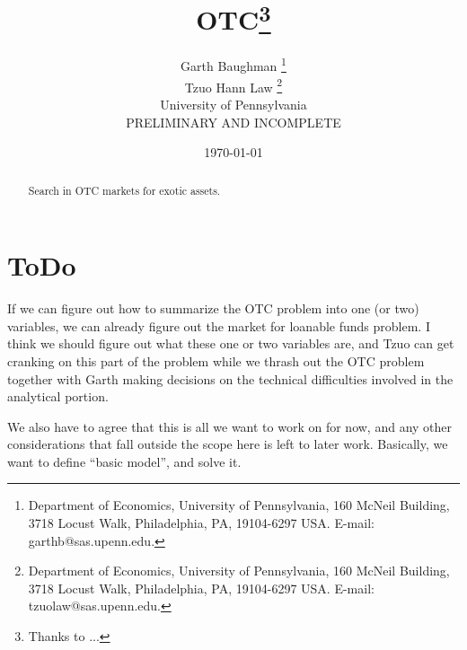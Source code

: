 \documentclass [12pt] {article}
\begin{document}
\title{\bf OTC\thanks{Thanks to ...}}
\author {
Garth Baughman \thanks{Department of Economics, University of Pennsylvania, 160 McNeil Building, 3718 Locust Walk, Philadelphia, PA, 19104-6297 USA. E-mail: garthb@sas.upenn.edu.}\\
Tzuo Hann Law \thanks{Department of Economics, University of Pennsylvania, 160 McNeil Building, 3718 Locust Walk, Philadelphia, PA, 19104-6297 USA. E-mail: tzuolaw@sas.upenn.edu.}
\\University of Pennsylvania \vspace{0.5in} \\ \vspace{0.5in} PRELIMINARY AND INCOMPLETE}
\date{\today}
\maketitle \vspace{-0.7cm}
\thispagestyle{empty}
\begin{abstract}
Search in OTC markets for exotic assets.
\end{abstract}
\newpage


\section{ToDo} If we can figure out how to summarize the OTC problem into one (or two) variables, we can already figure out the market for loanable funds problem. I think we should figure out what these one or two variables are, and Tzuo can get cranking on this part of the problem while we thrash out the OTC problem together with Garth making decisions on the technical difficulties involved in the analytical portion.

We also have to agree that this is all we want to work on for now, and any other considerations that fall outside the scope here is left to later work. Basically, we want to define ``basic model'', and solve it. 
\end{document}
